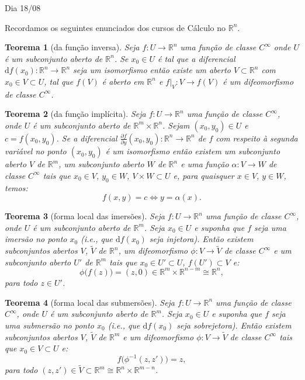 \documentclass[oneside,11pt]{amsart}
\newcommand{\R}{\mathds R}
\newcommand{\dd}{\mathrm d}
\theoremstyle{remark}\newtheorem{exercise}{Exercício}[section]
\theoremstyle{plain}\newtheorem{teo}{Teorema}[section]
\theoremstyle{plain}\newtheorem{lem}[teo]{Lema}
\theoremstyle{plain}\newtheorem{prop}[teo]{Proposição}
\theoremstyle{definition}\newtheorem{defin}[teo]{Definição}
\theoremstyle{remark}\newtheorem{rem}[teo]{Observação}
\theoremstyle{definition}\newtheorem{example}[teo]{Exemplo}
\numberwithin{equation}{section}
\begin{document}
\begin{section}{Dia 18/08}

Recordamos os seguintes enunciados dos cursos de Cálculo no $\R^n$.

\begin{teo}[da função inversa]
Seja $f:U\to\R^n$ uma função de classe $C^\infty$ onde $U$ é um subconjunto aberto de $\R^n$. Se $x_0\in U$
é tal que a diferencial $\dd f(x_0):\R^n\to\R^n$ seja um isomorfismo então existe um aberto $V\subset\R^n$ com
$x_0\in V\subset U$, tal que $f(V)$ é aberto em $\R^n$ e $f\vert_V:V\to f(V)$ é um difeomorfismo de classe $C^\infty$.
\end{teo}

\begin{teo}[da função implícita]
Seja $f:U\to\R^n$ uma função de classe $C^\infty$, onde $U$ é um subconjunto aberto de $\R^m\times\R^n$. Sejam
$(x_0,y_0)\in U$ e $c=f(x_0,y_0)$. Se a diferencial $\frac{\partial f}{\partial y}(x_0,y_0):\R^n\to\R^n$
de $f$ com respeito à segunda variável no ponto $(x_0,y_0)$ é um isomorfismo então existem um subconjunto aberto
$V$ de $\R^m$, um subconjunto aberto $W$ de $\R^n$ e uma função $\alpha:V\to W$ de classe $C^\infty$ tais que
$x_0\in V$, $y_0\in W$, $V\times W\subset U$ e, para quaisquer $x\in V$, $y\in W$, temos:
\[f(x,y)=c\Longleftrightarrow y=\alpha(x).\]
\end{teo}

\begin{teo}[forma local das imersões]
Seja $f:U\to\R^n$ uma função de classe $C^\infty$, onde $U$ é um subconjunto aberto de $\R^m$. Seja $x_0\in U$
e suponha que $f$ seja uma imersão no ponto $x_0$ (i.e., que $\dd f(x_0)$ seja injetora). Então existem subconjuntos
abertos $V$, $\widetilde V$ de $\R^n$, um difeomorfismo $\phi:V\to\widetilde V$ de classe $C^\infty$ e um subconjunto
aberto $U'$ de $\R^m$ tais que $x_0\in U'\subset U$, $f(U')\subset V$ e:
\[\phi\big(f(z)\big)=(z,0)\in\R^m\times\R^{n-m}\cong\R^n,\]
para todo $z\in U'$.
\end{teo}

\begin{teo}[forma local das submersões]
Seja $f:U\to\R^n$ uma função de classe $C^\infty$, onde $U$ é um subconjunto aberto de $\R^m$. Seja $x_0\in U$
e suponha que $f$ seja uma submersão no ponto $x_0$ (i.e., que\/ $\dd f(x_0)$ seja sobrejetora). Então existem
subconjuntos abertos $V$, $\widetilde V$ de $\R^m$ e um difeomorfismo $\phi:V\to\widetilde V$ de classe $C^\infty$
tais que $x_0\in V\subset U$ e:
\[f\big(\phi^{-1}(z,z')\big)=z,\]
para todo $(z,z')\in\widetilde V\subset\R^m\cong\R^n\times\R^{m-n}$.
\end{teo}


\end{section}
\end{document}
